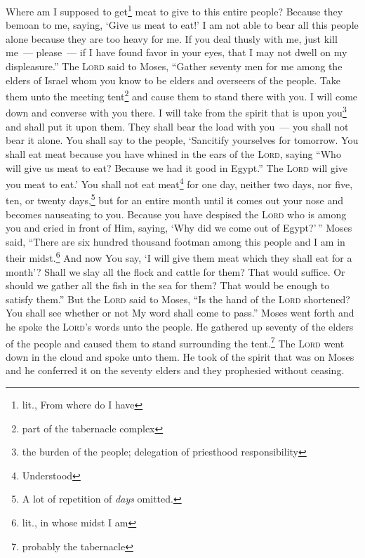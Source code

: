 \begin{inparaenum}
     Where am I supposed to get\footnote{lit., From where do I have} meat to give to this entire people? Because they bemoan to me, saying, `Give us meat to eat!'%
     I am not able to bear all this people alone because they are too heavy for me.%
     If you deal thusly with me, just kill me~--- please~--- if I have found favor in your eyes, that I may not dwell on my displeasure.''%
     The \textsc{Lord} said to Moses, ``Gather seventy men for me among the elders of Israel whom you know to be elders and overseers of the people. Take them unto the meeting tent\footnote{part of the tabernacle complex} and cause them to stand there with you.%
     I will come down and converse with you there. I will take from the spirit that is upon you\footnote{the burden of the people; delegation of priesthood responsibility} and shall put it upon them. They shall bear the load with you~--- you shall not bear it alone.%
     You shall say to the people, `Sancitify yourselves for tomorrow. You shall eat meat because you have whined in the ears of the \textsc{Lord}, saying ``Who will give us meat to eat? Because we had it good in Egypt.'' The \textsc{Lord} will give you meat to eat.'%
     You shall not eat meat\footnote{Understood} for one day, neither two days, nor five, ten, or twenty days,\footnote{A lot of repetition of \textit{days} omitted.}%
     but for an entire month until it comes out your nose and becomes nauseating to you. Because you have despised the \textsc{Lord} who is among you and cried in front of Him, saying, `Why did we come out of Egypt?'\,''%
     Moses said, ``There are six hundred thousand footman among this people and I am in their midst.\footnote{lit., in whose midst I am} And now You say, `I will give them meat which they shall eat for a month'?%
     Shall we slay all the flock and cattle for them? That would suffice. Or should we gather all the fish in the sea for them? That would be enough to satisfy them.''%
     But the \textsc{Lord} said to Moses, ``Is the hand of the \textsc{Lord} shortened? You shall see whether or not My word shall come to pass.''%
     Moses went forth and he spoke the \textsc{Lord}'s words unto the people. He gathered up seventy of the elders of the people and caused them to stand surrounding the tent.\footnote{probably the tabernacle}%
     The \textsc{Lord} went down in the cloud and spoke unto them. He took of the spirit that was on Moses and he conferred it on the seventy elders and they prophesied without ceasing.%

\end{inparaenum}
